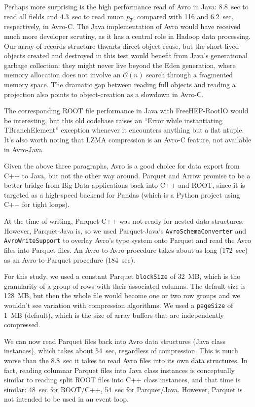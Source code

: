 \documentclass{article}
\begin{document}
Perhaps more surprising is the high performance read of Avro in Java: 8.8~sec to read all fields and 4.3~sec to read muon $p_T$, compared with 116 and 6.2~sec, respectively, in Avro-C. The Java implementation of Avro would have received much more developer scrutiny, as it has a central role in Hadoop data processing. Our array-of-records structure thwarts direct object reuse, but the short-lived objects created and destroyed in this test would benefit from Java's generational garbage collection: they might never live beyond the Eden generation, where memory allocation does not involve an $\mathcal{O}(n)$ search through a fragmented memory space. The dramatic gap between reading full objects and reading a projection also points to object-creation as a slowdown in Avro-C.

The corresponding ROOT file performance in Java with FreeHEP-RootIO would be interesting, but this old codebase raises an ``Error while instantiating TBranchElement'' exception whenever it encounters anything but a flat ntuple. It's also worth noting that LZMA compression is an Avro-C feature, not available in Avro-Java.

Given the above three paragraphs, Avro is a good choice for data export from C++ to Java, but not the other way around. Parquet and Arrow promise to be a better bridge from Big Data applications back into C++ and ROOT, since it is targeted as a high-speed backend for Pandas (which is a Python project using C++ for tight loops).

At the time of writing, Parquet-C++ was not ready for nested data structures. However, Parquet-Java is, so we used Parquet-Java's {\tt AvroSchemaConverter} and {\tt AvroWriteSupport} to overlay Avro's type system onto Parquet and read the Avro files into Parquet files. An Avro-to-Avro procedure takes about as long (172~sec) as an Avro-to-Parquet procedure (184~sec). 

For this study, we used a constant Parquet {\tt blockSize} of 32~MB, which is the granularity of a group of rows with their associated columns. The default size is 128~MB, but then the whole file would become one or two row groups and we wouldn't see variation with compression algorithms. We used a {\tt pageSize} of 1~MB (default), which is the size of array buffers that are independently compressed.

We can now read Parquet files back into Avro data structures (Java class instances), which takes about 54~sec, regardless of compression. This is much worse than the 8.8~sec it takes to read Avro files into its own data structures. In fact, reading columnar Parquet files into Java class instances is conceptually similar to reading split ROOT files into C++ class instances, and that time is similar: 48~sec for ROOT/C++, 54~sec for Parquet/Java. However, Parquet is not intended to be used in an event loop.
\end{document}
